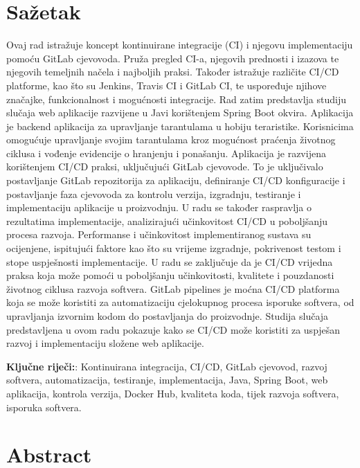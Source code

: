 \documentclass[a4paper,12pt,oneside]{article}
\begin{document}
\newpage
\section*{Sa\v{z}etak}

Ovaj rad istražuje koncept kontinuirane integracije (CI) i njegovu implementaciju pomoću GitLab cjevovoda. Pruža pregled CI-a, njegovih prednosti i izazova te njegovih temeljnih načela i najboljih praksi. Također istražuje različite CI/CD platforme, kao što su Jenkins, Travis CI i GitLab CI, te uspoređuje njihove značajke, funkcionalnost i mogućnosti integracije. Rad zatim predstavlja studiju slučaja web aplikacije razvijene u Javi korištenjem Spring Boot okvira. Aplikacija je backend aplikacija za upravljanje tarantulama u hobiju teraristike. Korisnicima omogućuje upravljanje svojim tarantulama kroz mogućnost praćenja životnog ciklusa i vođenje evidencije o hranjenju i ponašanju. Aplikacija je razvijena korištenjem CI/CD praksi, uključujući GitLab cjevovode. To je uključivalo postavljanje GitLab repozitorija za aplikaciju, definiranje CI/CD konfiguracije i postavljanje faza cjevovoda za kontrolu verzija, izgradnju, testiranje i implementaciju aplikacije u proizvodnju. U radu se također raspravlja o rezultatima implementacije, analizirajući učinkovitost CI/CD u poboljšanju procesa razvoja. Performanse i učinkovitost implementiranog sustava su ocijenjene, ispitujući faktore kao što su vrijeme izgradnje, pokrivenost testom i stope uspješnosti implementacije.
U radu se zaključuje da je CI/CD vrijedna praksa koja može pomoći u poboljšanju učinkovitosti, kvalitete i pouzdanosti životnog ciklusa razvoja softvera. GitLab pipelines je moćna CI/CD platforma koja se može koristiti za automatizaciju cjelokupnog procesa isporuke softvera, od upravljanja izvornim kodom do postavljanja do proizvodnje. Studija slučaja predstavljena u ovom radu pokazuje kako se CI/CD može koristiti za uspješan razvoj i implementaciju složene web aplikacije.

\bigskip
\noindent\textbf{Klju\v{c}ne rije\v{c}i:}: Kontinuirana integracija, CI/CD, GitLab cjevovod, razvoj softvera, automatizacija, testiranje, implementacija, Java, Spring Boot, web aplikacija, kontrola verzija, Docker Hub, kvaliteta koda, tijek razvoja softvera, isporuka softvera.


\newpage
\section*{Abstract}
\end{document}
